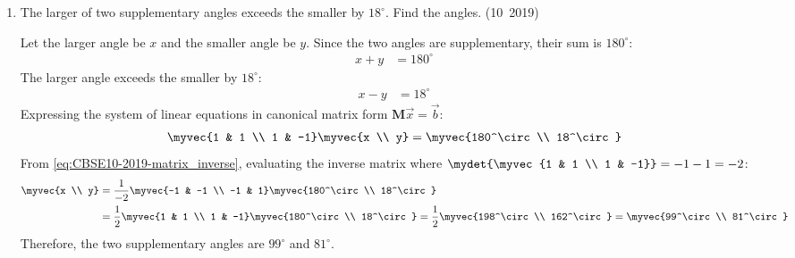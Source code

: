\begin{enumerate}[label=\thesubsection.\arabic*, ref=\thesubsection.\theenumi]
	\solution
	The maximum frequency is $50$, corresponding to the modal class $35$--$40$.
	From the modal class:
	\begin{align}
		l = 35, \quad h = 5, \quad f_1 = 50, \quad f_0 = 34, \quad f_2 = 42
	\end{align}
	From \eqref{eq:CBSE10-2019-mode}, the mode is given by:
	\begin{align}
		\text{Mode} &= l + \brak{\frac{f_1 - f_0}{2f_1 - f_0 - f_2}} \times h \\
		&= 35 + \brak{\frac{50 - 34}{2\brak{50} - 34 - 42}} \times 5 \\
		&= 35 + \brak{\frac{16}{24}} \times 5 = 35 + \frac{10}{3} \approx 38.33
	\end{align}
	
	\item The larger of two supplementary angles exceeds the smaller by $18^\circ$. Find the angles.
	\hfill (10~2019)
	
	\solution
	Let the larger angle be $x$ and the smaller angle be $y$.
	Since the two angles are supplementary, their sum is $180^\circ$:
	\begin{align}
		x + y &= 180^\circ \label{eq:EE26BTECH11223-10-q11-eq1}
	\end{align}
	The larger angle exceeds the smaller by $18^\circ$:
	\begin{align}
		x - y &= 18^\circ \label{eq:EE26BTECH11223-10-q11-eq2}
	\end{align}
	Expressing the system of linear equations in canonical matrix form $\mathbf{M}\vec{x} = \vec{b}$:
	\begin{align}
		\myvec{1 & 1 \\ 1 & -1}\myvec{x \\ y} = \myvec{180^\circ \\ 18^\circ}
	\end{align}
	From \eqref{eq:CBSE10-2019-matrix_inverse}, evaluating the inverse matrix where $\mydet{\myvec{1 & 1 \\ 1 & -1}} = -1 - 1 = -2$:
	\begin{align}
		\myvec{x \\ y} &= \frac{1}{-2}\myvec{-1 & -1 \\ -1 & 1}\myvec{180^\circ \\ 18^\circ} \\
		&= \frac{1}{2}\myvec{1 & 1 \\ 1 & -1}\myvec{180^\circ \\ 18^\circ} = \frac{1}{2}\myvec{198^\circ \\ 162^\circ} = \myvec{99^\circ \\ 81^\circ}
	\end{align}
	Therefore, the two supplementary angles are $99^\circ$ and $81^\circ$.
	

\end{enumerate}
